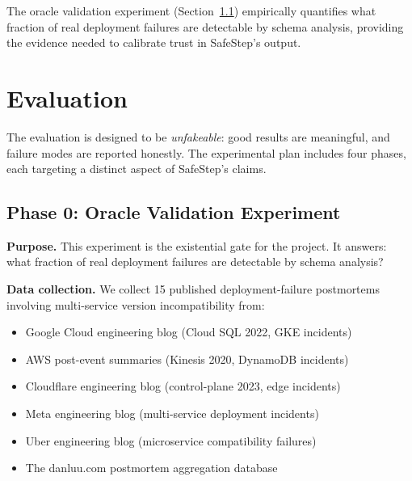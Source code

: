 \documentclass[10pt,twocolumn]{article}
\begin{document}
The oracle validation experiment (Section~\ref{sec:eval-oracle}) empirically quantifies what fraction of real deployment failures are detectable by schema analysis, providing the evidence needed to calibrate trust in SafeStep's output.

\section{Evaluation}
\label{sec:evaluation}

The evaluation is designed to be \emph{unfakeable}: good results are meaningful, and failure modes are reported honestly. The experimental plan includes four phases, each targeting a distinct aspect of SafeStep's claims.

\subsection{Phase 0: Oracle Validation Experiment}
\label{sec:eval-oracle}

\textbf{Purpose.} This experiment is the existential gate for the project. It answers: what fraction of real deployment failures are detectable by schema analysis?

\textbf{Data collection.} We collect 15 published deployment-failure postmortems involving multi-service version incompatibility from:
\begin{itemize}
\item Google Cloud engineering blog (Cloud SQL 2022, GKE incidents)
\item AWS post-event summaries (Kinesis 2020, DynamoDB incidents)
\item Cloudflare engineering blog (control-plane 2023, edge incidents)
\item Meta engineering blog (multi-service deployment incidents)
\item Uber engineering blog (microservice compatibility failures)
\item The danluu.com postmortem aggregation database
\end{itemize}
\end{document}
